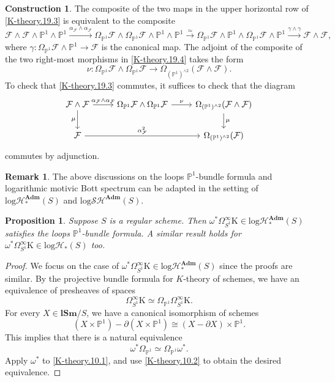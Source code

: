 \documentclass[11pt, a4paper]{amsart}
\newtheorem{prop}[thm]{Proposition}
\theoremstyle{definition}
\newtheorem{const}[thm]{Construction}
\newtheorem{rmk}[thm]{Remark}
\numberwithin{equation}{subsection}
\renewcommand{\P}{\mathbb{P}}
\newcommand{\lSm}{\mathbf{lSm}}
\newcommand{\Adm}{\mathbf{Adm}}
\newcommand{\Kth}{\mathrm{K}}
\newcommand{\cF}{\mathcal{F}}
\newcommand{\inflogHpt}{\mathrm{log}\mathcal{H}_\ast}
\newcommand{\inflogSH}{\mathrm{log}\mathcal{SH}}
\begin{document}
\begin{const}
The composite of the two maps in the upper horizontal row of \eqref{K-theory.19.3} is
equivalent to the composite 
\begin{equation}
\label{K-theory.19.4}
\cF\wedge \cF\wedge \P^1\wedge \P^1
\xrightarrow{\alpha_{\cF}\wedge \alpha_{\cF}}
\Omega_{\P^1}\cF\wedge \Omega_{\P^1}\cF\wedge \P^1\wedge \P^1
\xrightarrow{\simeq}
\Omega_{\P^1}\cF\wedge \P^1\wedge \Omega_{\P^1}\cF\wedge \P^1
\xrightarrow{\gamma\wedge \gamma}
\cF\wedge \cF,
\end{equation}
where $\gamma\colon \Omega_{\P^1}\cF\wedge \P^1\to \cF$ is the canonical map.
The adjoint of the composite of the two right-most morphisms in \eqref{K-theory.19.4} takes the form
\[
\nu
\colon
\Omega_{\P^1}\cF\wedge \Omega_{\P^1}\cF
\to
\Omega_{(\P^1)^{\wedge 2}}(\cF\wedge \cF).
\]
To check that \eqref{K-theory.19.3} commutes, it suffices to check that the diagram
\begin{equation}
\label{K-theory.19.5}
\begin{tikzcd}
\cF\wedge \cF\ar[d,"\mu"']\ar[r,"\alpha_{\cF}\wedge \alpha_{\cF}"]&
\Omega_{\P^1}\cF\wedge \Omega_{\P^1}\cF \ar[r,"\nu"]&
\Omega_{(\P^1)^{\wedge 2}}(\cF\wedge \cF)\ar[d,"\mu"]
\\
\cF\ar[rr,"\alpha_{\cF}^2"]&
&
\Omega_{(\P^1)^{\wedge 2}}(\cF)
\end{tikzcd}
\end{equation}
commutes by adjunction.
\end{const}

\begin{rmk}
The above discussions on the loops $\P^1$-bundle formula and logarithmic motivic Bott spectrum can be adapted in the setting of $\inflogHpt^\Adm(S)$ and $\inflogSH^\Adm(S)$.
\end{rmk}

\begin{prop}
\label{K-theory.10}
Suppose $S$ is a regular scheme. 
Then $\omega^*\Omega_{S^1}^\infty \Kth \in \inflogHpt^\Adm(S)$ satisfies the loops $\P^1$-bundle formula.
A similar result holds for $\omega^*\Omega_{S^1}^\infty \Kth \in \inflogHpt(S)$ too.
\end{prop}
\begin{proof}
We focus  on the case of $\omega^*\Omega_{S^1}^\infty \Kth \in \inflogHpt^\Adm(S)$ since the proofs are similar.
By the projective bundle formula for $K$-theory of schemes, we have an equivalence of presheaves of spaces
\begin{equation}
\label{K-theory.10.1}
\Omega_{S^1}^\infty \Kth
\simeq
\Omega_{\P^1}\Omega_{S^1}^\infty \Kth.
\end{equation}
For every $X\in \lSm/S$, we have a canonical isomorphism of schemes
\[
(X\times \P^1)-\partial(X\times \P^1)
\cong
(X-\partial X)\times \P^1.
\]
This implies that there is a natural equivalence
\begin{equation}
\label{K-theory.10.2}
\omega^*\Omega_{\P^1}
\simeq
\Omega_{\P^1}\omega^*.
\end{equation}
Apply $\omega^*$ to \eqref{K-theory.10.1}, and use \eqref{K-theory.10.2} to obtain the desired equivalence.
\end{proof}
\end{document}

